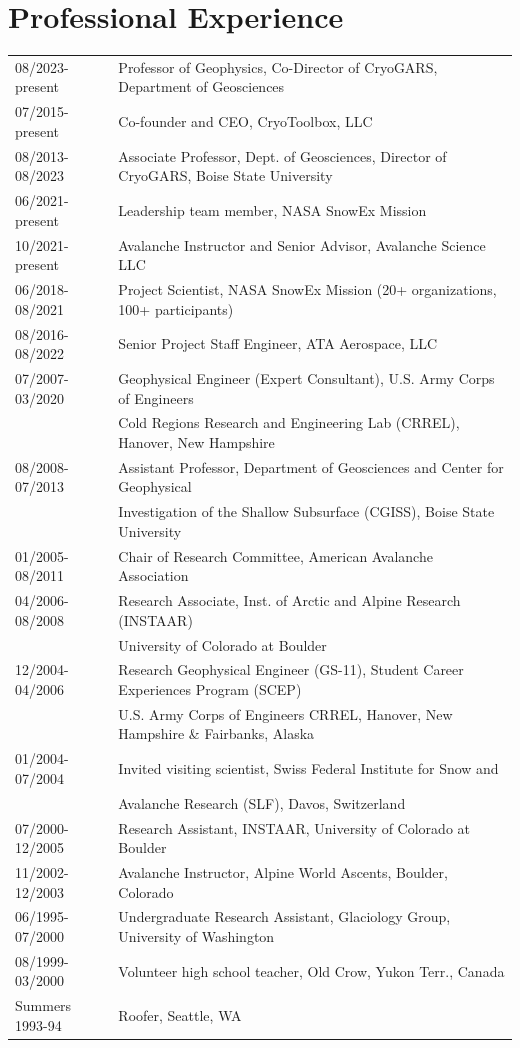 \documentclass[11pt]{article}
\begin{document}
\section*{Professional Experience}
\begin{tabular}{ll}
08/2023-present & Professor of Geophysics, Co-Director of CryoGARS, Department of Geosciences \\
07/2015-present & Co-founder and CEO, CryoToolbox, LLC \\
08/2013-08/2023 & Associate Professor, Dept. of Geosciences, Director of CryoGARS, Boise State University \\
06/2021-present & Leadership team member, NASA SnowEx Mission \\
10/2021-present & Avalanche Instructor and Senior Advisor, Avalanche Science LLC \\
06/2018-08/2021 & Project Scientist, NASA SnowEx Mission (20+ organizations, 100+ participants) \\
08/2016-08/2022 & Senior Project Staff Engineer, ATA Aerospace, LLC \\
07/2007-03/2020 & Geophysical Engineer (Expert Consultant), U.S. Army Corps of Engineers \\
& Cold Regions Research and Engineering Lab (CRREL), Hanover, New Hampshire \\
08/2008-07/2013 & Assistant Professor, Department of Geosciences and Center for Geophysical \\
&   Investigation of the Shallow Subsurface (CGISS), Boise State University \\
01/2005-08/2011 & Chair of Research Committee, American Avalanche Association \\
04/2006-08/2008 & Research Associate, Inst. of Arctic and Alpine Research (INSTAAR) \\
& University of Colorado at Boulder \\ 
12/2004-04/2006 & Research Geophysical Engineer (GS-11), Student Career Experiences Program (SCEP) \\
& U.S. Army Corps of Engineers CRREL, Hanover, New Hampshire \& Fairbanks, Alaska \\
01/2004-07/2004 & Invited visiting scientist, Swiss Federal Institute for Snow and \\ 
& Avalanche Research (SLF), Davos, Switzerland \\ 
07/2000-12/2005 & Research Assistant, INSTAAR, University of Colorado at Boulder \\
11/2002-12/2003 & Avalanche Instructor, Alpine World Ascents, Boulder, Colorado \\
06/1995-07/2000 & Undergraduate Research Assistant, Glaciology Group, University of Washington \\
08/1999-03/2000 & Volunteer high school teacher, Old Crow, Yukon Terr., Canada \\
Summers 1993-94 & Roofer, Seattle, WA \\
\end{tabular}
\end{document}
